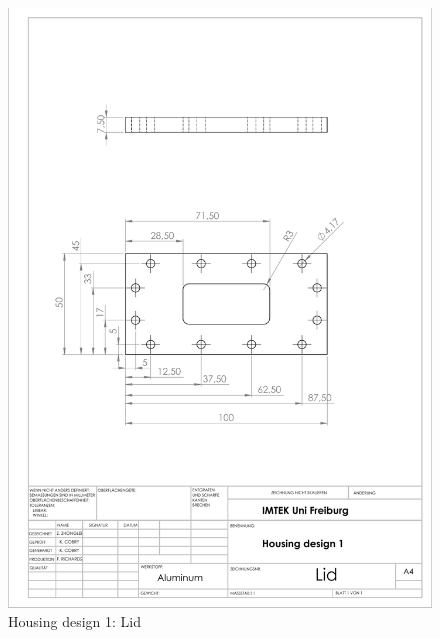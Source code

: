 \begin{figure}[h]%
\centering
\includegraphics[width=1\textwidth]{figures/appendix/housingdesign1lid}%
\caption{Housing design 1: Lid}%
\label{housingdesign1}%
\end{figure}

\clearpage

